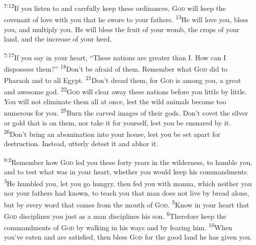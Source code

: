 \documentclass[openany,12pt,english]{book}
\newenvironment{para}{\par\pretolerance=100\tolerance=200\setlength{\emergencystretch}{0.6em}\relax}{\par}
\begin{document}
\begin{para}
    \textsuperscript{7:12}\thinspace{}If you lis\-ten to and care\-ful\-ly keep these ordinances, \textsc{God} will keep the cov\-e\-nant of love with you that he swore to your fathers.
    \textsuperscript{13}\thinspace{}He will love you, bless you, and mul\-ti\-ply you. He will bless the fruit of your womb, the crops of your land, and the in\-crease of your herd.
\end{para}

\begin{para}
    \textsuperscript{7:17}\thinspace{}If you say in your heart, “These nations are greater than I. How can I dis\-pos\-sess them?”
    \textsuperscript{18}\thinspace{}Don't be a\-fraid of them. Re\-mem\-ber what \textsc{God} did to Pharaoh and to all Egypt.
    \textsuperscript{21}\thinspace{}Don't dread them, for \textsc{God} is a\-mong you, a great and awe\-some god.
    \textsuperscript{22}\thinspace{}\textsc{God} will clear a\-way these nations be\-fore you lit\-tle by lit\-tle. You will not e\-lim\-i\-nate them all at once, lest the wild animals be\-come too nu\-mer\-ous for you.
    \textsuperscript{25}\thinspace{}Burn the carved images of their gods. Don't cov\-et the sil\-ver or gold that is on them, nor take it for your\-self, lest you be en\-snared by it.
    \textsuperscript{26}\thinspace{}Don't bring an a\-bom\-i\-na\-tion in\-to your house, lest you be set a\-part for de\-struc\-tion. In\-stead, utterly de\-test it and ab\-hor it.
\end{para}

\bigskip{}

\begin{para}
    \textsuperscript{8:2}\thinspace{}Re\-mem\-ber how \textsc{God} led you these for\-ty years in the wil\-der\-ness, to hum\-ble you, and to test what was in your heart, wheth\-er you would keep his commandments.
    \textsuperscript{3}\thinspace{}He humbled you, let you go hun\-gry, then fed you with man\-na, which nei\-ther you nor your fathers had known, to teach you that man does not live by bread a\-lone, but by eve\-ry word that co\-mes from the mouth of \textsc{God}.
    \textsuperscript{5}\thinspace{}Know in your heart that \textsc{God} disciplines you just as a man disciplines his son.
    \textsuperscript{6}\thinspace{}There\-fore keep the commandments of \textsc{God} by walk\-ing in his ways and by fearing him.
    \textsuperscript{10}\thinspace{}When you've eat\-en and are sat\-is\-fied, then bless \textsc{God} for the good land he has giv\-en you.
\end{para}
\end{document}
